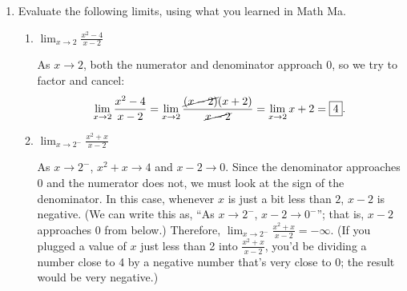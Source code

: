 \documentclass[main]{subfiles}
\begin{document}
\begin{enumerate}
  \item
    Evaluate the following limits, using what you learned in Math Ma.  

    \begin{enumerate}
 

    \item 
      \begin{problem}[\vfill]
        $\displaystyle\lim_{x \to 2} \frac{x^2-4}{x-2}$
      \end{problem}

      \begin{solution}
        As $x \to 2$, both the numerator and denominator approach 0, so we
        try to factor and cancel:
        \[ \lim_{x \to 2} \frac{x^2 - 4}{x - 2} = \lim_{x \to 2}
        \frac{\cancel{(x - 2)} (x + 2)}{\cancel{x - 2}} = \lim_{x \to 2} x
        + 2 = \boxed{4}.\]
      \end{solution}

    \item
      \begin{problem}[\vfill]
        $\displaystyle\lim_{x \to 2^-} \frac{x^2+x}{x-2}$
      \end{problem}

      \begin{solution}
        As $x \to 2^-$, $x^2 + x \to 4$ and $x - 2 \to 0$.  Since the
        denominator approaches 0 and the numerator does not, we must look
        at the sign of the denominator.  In this case, whenever $x$ is
        just a bit less than $2$, $x - 2$ is negative.  (We can write this
        as, ``As $x \to 2^-$, $x - 2 \to 0^-$''; that is, $x - 2$
        approaches 0 from below.)  Therefore, $\displaystyle \lim_{x \to
          2^-} \frac{x^2 + x}{x - 2} = \boxed{-\infty}$.  (If you plugged
        a value of $x$ just less than 2 into $\frac{x^2 + x}{x - 2}$,
        you'd be dividing a number close to 4 by a negative number that's
        very close to 0; the result would be very negative.)
      \end{solution}


\end{enumerate}
\end{enumerate}
\end{document}
